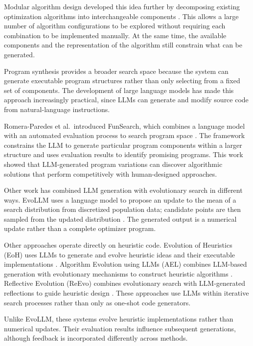 Modular algorithm design developed this idea further by decomposing existing
optimization algorithms into interchangeable components
\cite{vanRijn2016,deNobel2021}. This allows a large number of algorithm
configurations to be explored without requiring each combination to be
implemented manually. At the same time, the available components and the
representation of the algorithm still constrain what can be generated.

Program synthesis provides a broader search space because the system can
generate executable program structures rather than only selecting from a
fixed set of components. The development of large language models has made
this approach increasingly practical, since LLMs can generate and modify
source code from natural-language instructions.

Romera-Paredes et al.\ introduced FunSearch, which combines a language model
with an automated evaluation process to search program space
\cite{Romera2023}. The framework constrains the LLM to generate particular
program components within a larger structure and uses evaluation results to
identify promising programs. This work showed that LLM-generated program
variations can discover algorithmic solutions that perform competitively with
human-designed approaches.

Other work has combined LLM generation with evolutionary search in different
ways. EvoLLM uses a language model to propose an update to the mean of a search
distribution from discretized population data; candidate points are then
sampled from the updated distribution \cite{Lange2024}. The generated
output is a numerical update rather than a complete optimizer program.

Other approaches operate directly on heuristic code. Evolution of
Heuristics (EoH) uses LLMs to generate and evolve heuristic ideas
and their executable implementations \cite{Liu2024}. Algorithm
Evolution using LLMs (AEL) combines LLM-based generation with
evolutionary mechanisms to construct heuristic algorithms
\cite{AEL2024}. Reflective Evolution (ReEvo) combines evolutionary
search with LLM-generated reflections to guide heuristic design
\cite{ReEvo2024}. These approaches use LLMs within iterative search
processes rather than only as one-shot code generators.

Unlike EvoLLM, these systems evolve heuristic implementations rather than
numerical updates. Their evaluation results influence subsequent generations,
although feedback is incorporated differently across methods.


